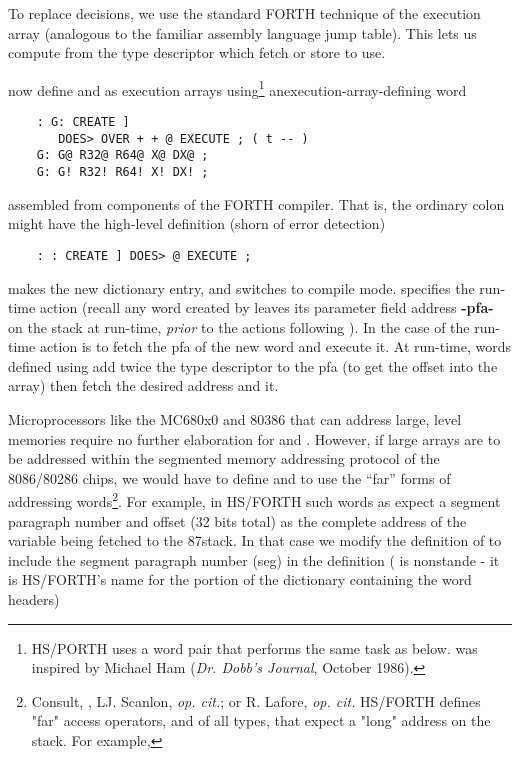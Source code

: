 To replace decisions, we use the standard FORTH technique of the execution array (analogous to the familiar assembly language jump table). This lets us compute from the type descriptor which fetch or store to use.

 now define  and  as execution arrays using\footnote{HS/PORTH uses a word pair  that performs the same task as  below.  was inspired by Michael Ham (\textit{Dr. Dobb's Journal}, October 1986).} anexecution-array-defining word 

\begin{lstlisting}
    : G: CREATE ]
       DOES> OVER + + @ EXECUTE ; ( t -- )
    G: G@ R32@ R64@ X@ DX@ ;
    G: G! R32! R64! X! DX! ;
\end{lstlisting}

assembled from components of the FORTH compiler. That is, the ordinary colon \bc{:} might have the high-level definition (shorn of error detection)

\begin{lstlisting}
    : : CREATE ] DOES> @ EXECUTE ;
\end{lstlisting}

 makes the new dictionary entry, and \bc{]} switches to
compile mode.  specifies the run-time action (recall any word created by  leaves its parameter field address
\textbf{-pfa-} on the stack at run-time, \textit{prior} to the actions following ). In the case of \bc{:} the run-time action is to fetch the pfa of the new word and execute it. At run-time, words defined using  add twice the type descriptor to the pfa (to get the offset into the array) then fetch the desired address and  it.

Microprocessors like the MC680x0 and 80386 that can address large, level memories require no further elaboration for  and . However, if large arrays are to be addressed within the segmented memory addressing protocol of the 8086/80286 chips, we would have to define  and  to use the “far” forms of addressing words\footnote{Consult, \eg, LJ. Scanlon, \textit{op. cit.}; or R. Lafore, \textit{op. cit.} HS/FORTH defines "far" access operators,  and  of all types, that expect a "long" address on the stack. For example, }. For example, in HS/FORTH such words as  expect a segment paragraph number and offset (32 bits total) as the complete address of the variable being fetched to the 87stack. In that case we modify the definition of  to include the segment paragraph number (seg) in the definition ( is nonstande - it is HS/FORTH’s name for the portion of the dictionary containing the word headers)

